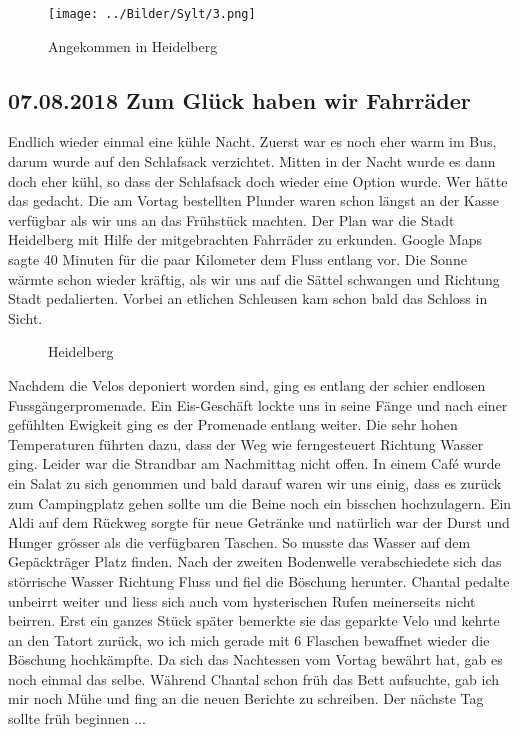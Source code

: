 \begin{figure}[hb]
    \centering
    \texttt{[image: ../Bilder/Sylt/3.png]}
    \caption{Angekommen in Heidelberg}
    \label{img:Sardinien}
\end{figure}

\subsection{07.08.2018 Zum Glück haben wir Fahrräder}
Endlich wieder einmal eine kühle Nacht.
Zuerst war es noch eher warm im Bus, darum wurde auf den Schlafsack verzichtet.
Mitten in der Nacht wurde es dann doch eher kühl, so dass der Schlafsack doch wieder eine Option wurde.
Wer hätte das gedacht.
Die am Vortag bestellten Plunder waren schon längst an der Kasse verfügbar als wir uns an das Frühstück machten.
Der Plan war die Stadt Heidelberg mit Hilfe der mitgebrachten Fahrräder zu erkunden. 
Google Maps sagte 40 Minuten für die paar Kilometer dem Fluss entlang vor.
Die Sonne wärmte schon wieder kräftig, als wir uns auf die Sättel schwangen und Richtung Stadt pedalierten.
Vorbei an etlichen Schleusen kam schon bald das Schloss in Sicht. 

\begin{figure}[H]
   \centering
   \quad
   \quad
   \quad
   \caption[Heidelberg]{Heidelberg}
\end{figure}

Nachdem die Velos deponiert worden sind, ging es entlang der schier endlosen Fussgängerpromenade.
Ein Eis-Geschäft lockte uns in seine Fänge und nach einer gefühlten Ewigkeit ging es der Promenade entlang weiter.
Die sehr hohen Temperaturen führten dazu, dass der Weg wie ferngesteuert Richtung Wasser ging. 
Leider war die Strandbar am Nachmittag nicht offen. 
In einem Café wurde ein Salat zu sich genommen und bald darauf waren wir uns einig, dass es zurück zum Campingplatz gehen sollte um die Beine noch ein bisschen hochzulagern.
Ein Aldi auf dem Rückweg sorgte für neue Getränke und natürlich war der Durst und Hunger grösser als die verfügbaren Taschen.
So musste das Wasser auf dem Gepäckträger Platz finden. 
Nach der zweiten Bodenwelle verabschiedete sich das störrische Wasser Richtung Fluss und fiel die Böschung herunter.
Chantal pedalte unbeirrt weiter und liess sich auch vom hysterischen Rufen meinerseits nicht beirren.
Erst ein ganzes Stück später bemerkte sie das geparkte Velo und kehrte an den Tatort zurück, wo ich mich gerade mit 6 Flaschen bewaffnet wieder die Böschung hochkämpfte.
Da sich das Nachtessen vom Vortag bewährt hat, gab es noch einmal das selbe.
Während Chantal schon früh das Bett aufsuchte, gab ich mir noch Mühe und fing an die neuen Berichte zu schreiben.
Der nächste Tag sollte früh beginnen ... 

